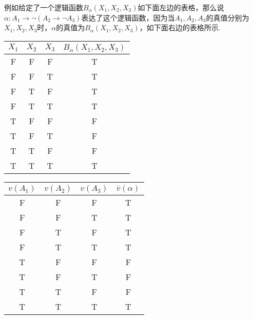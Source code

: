 \documentclass[main.tex]{subfiles}
\begin{document}
\begin{note}
    例如给定了一个逻辑函数\(B_\alpha(X_1, X_2, X_3)\)如下面左边的表格，那么说\(\alpha: A_1 \to \neg (A_2 \to \neg A_3)\)表达了这个逻辑函数，因为当\(A_1, A_2, A_3\)的真值分别为\(X_1, X_2, X_3\)时，\(\alpha\)的真值为\(B_\alpha(X_1, X_2, X_3)\)，如下面右边的表格所示.
    
        \begin{center}

            \begin{tabular}{ccc|c}
                \hline
                \(X_1\) & \(X_2\) & \(X_3\) & \(B_\alpha(X_1, X_2, X_3)\) \\
                \hline
                F & F & F & T \\
                F & F & T & T \\
                F & T & F & T \\
                F & T & T & T \\
                T & F & F & F \\
                T & F & T & F \\
                T & T & F & F \\
                T & T & T & T \\
                \hline
            \end{tabular}
            \quad
            \begin{tabular}{ccc|c}
                \hline
                \(v(A_1)\) & \(v(A_2)\) & \(v(A_3)\) & \(\bar{v}(\alpha)\) \\
                \hline
                F & F & F & T \\
                F & F & T & T \\
                F & T & F & T \\
                F & T & T & T \\
                T & F & F & F \\
                T & F & T & F \\
                T & T & F & F \\
                T & T & T & T \\
                \hline
            \end{tabular}

        \end{center}

\end{note}
\end{document}
